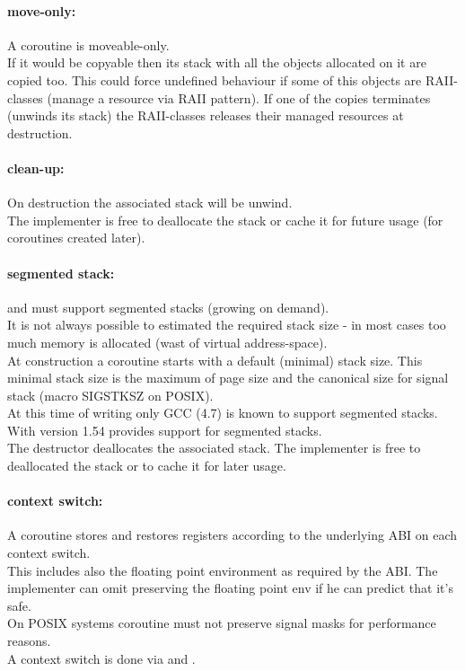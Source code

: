 \paragraph*{move-only:}
A coroutine is moveable-only.\\
\newline
If it would be copyable then its stack with all the objects allocated on it
are copied too. This could force undefined behaviour if some of this objects are
RAII-classes (manage a resource via RAII pattern). If one of the copies
terminates (unwinds its stack) the RAII-classes releases their managed resources
at destruction.

\paragraph*{clean-up:}
On destruction the associated stack will be unwind.\\
\newline
The implementer is free to deallocate the stack or cache it for future usage
(for coroutines created later).

\paragraph*{segmented stack:}
\pushcoro and \pullcoro must support segmented stacks (growing on demand).\\
\newline
It is not always possible to estimated the required stack size - in most cases
too much memory is allocated (wast of virtual address-space).\\
\newline
At construction a coroutine starts with a default (minimal) stack size. This
minimal stack size is the maximum of page size and the canonical size for signal
stack (macro SIGSTKSZ on POSIX).\\
\newline
At this time of writing only GCC (4.7)\cite{gccsplit} is known to support
segmented stacks. With version 1.54 \boostcoroutine provides support for
segmented stacks.\\
\newline
The destructor deallocates the associated stack. The implementer is free to
deallocated the stack or to cache it for later usage.

\paragraph*{context switch:}
A coroutine stores and restores registers according to the underlying ABI on
each context switch.\\
\newline
This includes also the floating point environment as required by the ABI. The
implementer can omit preserving the floating point env if he can predict that
it's safe.\\
\newline
On POSIX systems coroutine must not preserve signal masks for performance
reasons.\\
\newline
A context switch is done via \pushcoroop and \pullcoroop.

